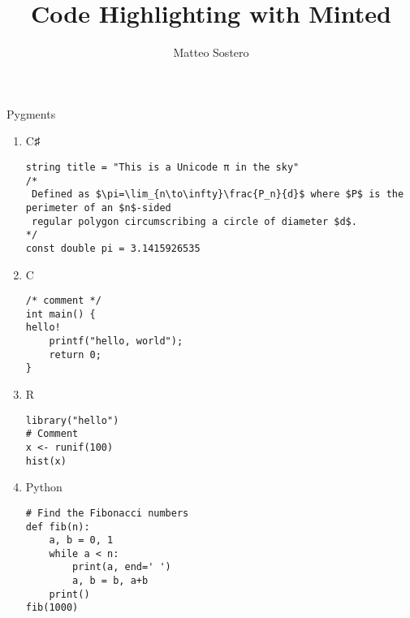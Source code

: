 \documentclass[10pt,a4paper]{article}
\title{Code Highlighting with Minted}
\author{Matteo Sostero}
\begin{document}
\maketitle
Pygments 
\begin{enumerate}

\item C♯
\begin{verbatim}
string title = "This is a Unicode π in the sky"
/*
 Defined as $\pi=\lim_{n\to\infty}\frac{P_n}{d}$ where $P$ is the perimeter of an $n$-sided
 regular polygon circumscribing a circle of diameter $d$.
*/
const double pi = 3.1415926535
\end{verbatim}

\item C
\begin{verbatim}
/* comment */
int main() {
hello!
	printf("hello, world");
	return 0;
}
\end{verbatim}

\item R
\begin{verbatim}
library("hello")
# Comment
x <- runif(100)
hist(x)
\end{verbatim}

\item Python
\begin{verbatim}
# Find the Fibonacci numbers
def fib(n):
    a, b = 0, 1
    while a < n:
        print(a, end=' ')
        a, b = b, a+b
    print()
fib(1000)
\end{verbatim}
\end{enumerate}
\end{document}
